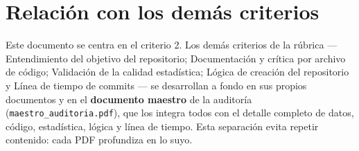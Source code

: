 \section{Relación con los demás criterios}

Este documento se centra en el criterio 2. Los demás criterios de la
rúbrica — Entendimiento del objetivo del repositorio; Documentación y crítica por archivo de código; Validación de la calidad estadística; Lógica de creación del repositorio y Línea de tiempo de commits — se desarrollan a fondo en sus propios documentos
y en el \textbf{documento maestro} de la auditoría (\texttt{maestro\_auditoria.pdf}),
que los integra todos con el detalle completo de datos, código, estadística,
lógica y línea de tiempo. Esta separación evita repetir contenido: cada PDF
profundiza en lo suyo.
